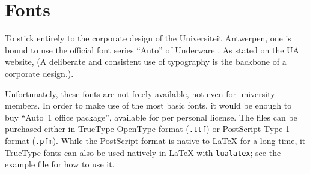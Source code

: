 \section{Fonts}

To stick entirely to the corporate design of the Universiteit Antwerpen, one is
bound to use the official font series \enquote{Auto} of Underware
\cite{Underware::ATI}. As stated on the UA website,  (A deliberate and consistent use of typography is the backbone of a
corporate design.).

Unfortunately, these fonts are not freely available, not even for university
members. In order to make use of the most basic fonts, it would be enough to
buy \enquote{Auto~1 office package}, available for  per personal
license. The files can be purchased either in TrueType OpenType format
(\lstinline!.ttf!) or PostScript Type 1 format (\lstinline!.pfm!). While the
PostScript format is native to \LaTeX{} for a long time, it TrueType-fonts can
also be used natively in \LaTeX{} with \lstinline!lualatex!; see the example
file for how to use it.

